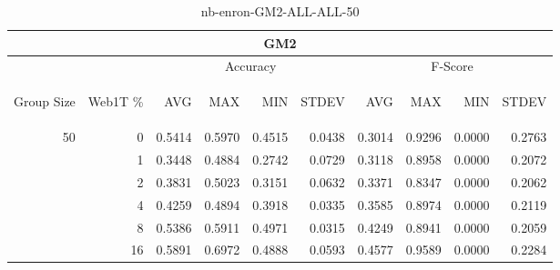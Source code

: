 \begin{center}
\begin{table}[htbp]
\begin{tabular}{ | r | r | r | r | r | r | r | r | r | r |}
\hline
\multicolumn{10}{|c|}{GM2}\\
\hline
 & & \multicolumn{4}{|c|}{Accuracy} & \multicolumn{4}{|c|}{F-Score}\\ \cline{3-10}
\begin{sideways}Group Size\end{sideways} & \begin{sideways}Web1T \%\end{sideways} & \begin{sideways}AVG\end{sideways} & \begin{sideways}MAX\end{sideways} & \begin{sideways}MIN\end{sideways} & \begin{sideways}STDEV\end{sideways} & \begin{sideways}AVG\end{sideways} & \begin{sideways}MAX\end{sideways} & \begin{sideways}MIN\end{sideways} & \begin{sideways}STDEV\end{sideways}\\
\hline
\multirow{6}{*}{50}
 & 0 & 0.5414 & 0.5970 & 0.4515 & 0.0438 & 0.3014 & 0.9296 & 0.0000 & 0.2763\\ \cline{2-10}
 & 1 & 0.3448 & 0.4884 & 0.2742 & 0.0729 & 0.3118 & 0.8958 & 0.0000 & 0.2072\\ \cline{2-10}
 & 2 & 0.3831 & 0.5023 & 0.3151 & 0.0632 & 0.3371 & 0.8347 & 0.0000 & 0.2062\\ \cline{2-10}
 & 4 & 0.4259 & 0.4894 & 0.3918 & 0.0335 & 0.3585 & 0.8974 & 0.0000 & 0.2119\\ \cline{2-10}
 & 8 & 0.5386 & 0.5911 & 0.4971 & 0.0315 & 0.4249 & 0.8941 & 0.0000 & 0.2059\\ \cline{2-10}
 & 16 & 0.5891 & 0.6972 & 0.4888 & 0.0593 & 0.4577 & 0.9589 & 0.0000 & 0.2284\\ \cline{2-10}
\hline
\end{tabular}
\caption{nb-enron-GM2-ALL-ALL-50}
\end{table}
\end{center}


